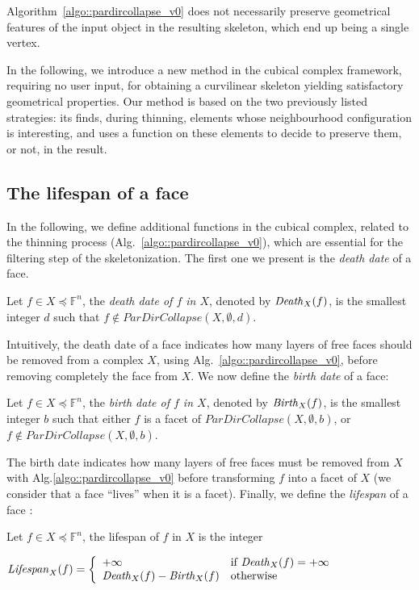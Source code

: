 \documentclass[final,envcountsame]{llncs}
\def\myem#1{{\em #1}}
\def\quotes#1{``#1''}
\def\birth#1#2{\mbox{\it{}Birth\/}_{#2}(#1)}
\def\death#1#2{\mbox{\it{}Death\/}_{#2}(#1)}
\def\lifespan#1#2{\mbox{\it{}Lifespan\/}_{#2}(#1)}
\def\allfaces#1{\mathbb{F}^{#1}}
\def\subcomplex#1#2{#1 \preceq #2}
\def\complex#1#2{\subcomplex{#2}{\allfaces{#1}}}
\begin{document}
Algorithm~\ref{algo::pardircollapse_v0} does not necessarily preserve geometrical features of the input object in the resulting skeleton, which end up being a single vertex.

In the following, we introduce a new method in the cubical complex framework, requiring no user input, for obtaining a curvilinear skeleton yielding satisfactory geometrical properties. Our method is based on the two previously listed strategies: its finds, during thinning, elements whose neighbourhood configuration is interesting, and uses a function on these elements to decide to preserve them, or not, in the result.

\subsection{The lifespan of a face}
In the following, we define additional functions in the cubical complex, related to the thinning process (Alg.~\ref{algo::pardircollapse_v0}), which are essential for the filtering step of the skeletonization. The first one we present is the \myem{death date} of a face.

\begin{definition}
Let $f \in \complex{n}{X}$, the \myem{death date of $f$ in $X$}, denoted by $\death{f}{X}$, is the smallest integer $d$ such that $f \notin ParDirCollapse(X, \emptyset, d)$. 
\end{definition}

Intuitively, the death date of a face indicates how many layers of free faces should be removed from a complex $X$, using Alg.~\ref{algo::pardircollapse_v0}, before removing completely the face from $X$. We now define the \myem{birth date} of a face:

\begin{definition}
Let $f \in \complex{n}{X}$, the \myem{birth date of $f$ in $X$}, denoted by $\birth{f}{X}$, is the smallest integer $b$ such that either $f$ is a facet of $ParDirCollapse(X, \emptyset, b)$, or $f \notin ParDirCollapse(X, \emptyset, b)$.
\end{definition}

The birth date indicates how many layers of free faces must be removed from $X$ with Alg.\ref{algo::pardircollapse_v0} before transforming $f$ into a facet of $X$ (we consider that a face \quotes{lives} when it is a facet).
Finally, we define the \myem{lifespan} of a face :

\begin{definition}
Let $f \in \complex{n}{X}$, the lifespan of $f$ in $X$ is the integer 

\begin{math}
\lifespan{f}{X} = \left\{
\begin{array}{ll}
+\infty & \text{if $\death{f}{X}=+\infty$}\\
\death{f}{X} - \birth{f}{X} & \text{otherwise}
\end{array}
\right.
\end{math}
\end{definition}
\end{document}
